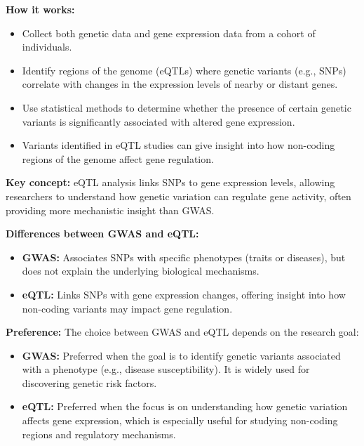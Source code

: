 \documentclass[a4paper]{article}
\begin{document}
\begin{itemize}
    \textbf{How it works:}
    \begin{itemize}
        \item Collect both genetic data and gene expression data from a cohort of individuals.
        \item Identify regions of the genome (eQTLs) where genetic variants 
        (e.g., SNPs) correlate with changes in the expression levels of nearby or distant genes.
        \item Use statistical methods to determine whether the presence of 
        certain genetic variants is significantly associated with altered gene expression.
        \item Variants identified in eQTL studies can give insight into how 
        non-coding regions of the genome affect gene regulation.
    \end{itemize}

    \textbf{Key concept:} eQTL analysis links SNPs to gene expression levels, 
    allowing researchers to understand how genetic variation can regulate gene 
    activity, often providing more mechanistic insight than GWAS.

\end{itemize}

\textbf{Differences between GWAS and eQTL:}
\begin{itemize}
    \item \textbf{GWAS:} Associates SNPs with specific phenotypes (traits or 
    diseases), but does not explain the underlying biological mechanisms.
    \item \textbf{eQTL:} Links SNPs with gene expression changes, offering 
    insight into how non-coding variants may impact gene regulation.
\end{itemize}

\textbf{Preference:}
The choice between GWAS and eQTL depends on the research goal:
\begin{itemize}
    \item \textbf{GWAS:} Preferred when the goal is to identify genetic variants 
    associated with a phenotype (e.g., disease susceptibility). It is widely 
    used for discovering genetic risk factors.
    \item \textbf{eQTL:} Preferred when the focus is on understanding how 
    genetic variation affects gene expression, which is especially useful for 
    studying non-coding regions and regulatory mechanisms.
\end{itemize}

\end{document}
